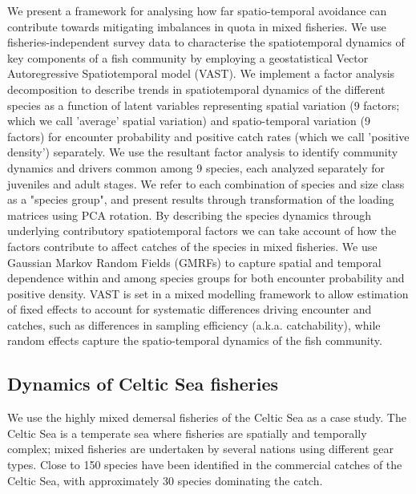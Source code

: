 \documentclass[fleqn,10pt]{wlscirep}
\begin{document}
\begin{linenumbers}
We present a framework for analysing how far spatio-temporal avoidance can
contribute towards mitigating imbalances in quota in mixed fisheries. We use
fisheries-independent survey data to characterise the spatiotemporal dynamics
of key components of a fish community by employing a geostatistical Vector
Autoregressive Spatiotemporal model (VAST). We implement a factor analysis
decomposition to describe trends in spatiotemporal dynamics of the different
species as a function of latent variables\cite{Thorson2015} representing
spatial variation (9 factors; which we call 'average' spatial variation) and
spatio-temporal variation (9 factors) for encounter probability and positive
catch rates (which we call 'positive density') separately\cite{Thorson2015a}.
We use the resultant factor analysis to identify community dynamics and drivers
common among 9 species, each analyzed separately for juveniles and adult
stages.  We refer to each combination of species and size class as a "species
group", and present results through transformation of the loading matrices
using PCA rotation. By describing the species dynamics through
underlying contributory spatiotemporal factors we can take account of how the
factors contribute to affect catches of the species in mixed fisheries.
We use Gaussian Markov Random Fields (GMRFs) to capture spatial and temporal
dependence within and among species groups for both encounter probability and
positive density\cite{Thorson2013}. VAST is set in a mixed modelling framework
to allow estimation of fixed effects to account for systematic differences
driving encounter and catches, such as differences in sampling efficiency
(a.k.a.  catchability), while random effects capture the spatio-temporal
dynamics of the fish community.\\

\subsection*{Dynamics of Celtic Sea fisheries\\}

We use the highly mixed demersal fisheries of the Celtic Sea as a case study.
The Celtic Sea is a temperate sea where fisheries are spatially and temporally
complex; mixed fisheries are undertaken by several nations using different gear
types\cite{Ellis2000, Gerritsen2012}. Close to 150 species have been
identified in the commercial catches of the Celtic Sea, with approximately 30
species dominating the catch\cite{Mateo2016}.\\


\end{linenumbers}
\end{document}
